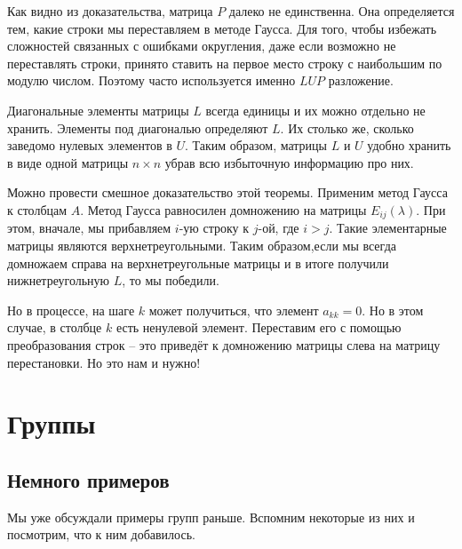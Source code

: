 \rm Как видно из доказательства, матрица $P$ далеко не единственна. Она определяется тем, какие строки мы переставляем в методе Гаусса. Для того, чтобы избежать сложностей связанных с ошибками округления, даже если возможно не переставлять строки, принято ставить на первое место строку с наибольшим по модулю числом.
Поэтому часто используется именно $LUP$ разложение.
\erm

\rm  Диагональные элементы матрицы $L$ всегда единицы и их можно отдельно не хранить. Элементы под диагональю определяют $L$. Их столько же, сколько заведомо нулевых элементов в $U$. Таким образом, матрицы $L$ и $U$ удобно хранить в виде одной матрицы $n\times n$ убрав всю избыточную информацию про них.
\erm


\rm Можно провести смешное доказательство этой теоремы. Применим метод Гаусса к столбцам $A$. Метод Гаусса равносилен домножению на матрицы $E_{ij}(\lambda)$. При этом, вначале, мы прибавляем $i$-ую строку к $j$-ой, где $i>j$. Такие элементарные матрицы являются верхнетреугольными. Таким образом,если мы всегда домножаем справа на верхнетреугольные матрицы и в итоге получили нижнетреугольную $L$, то мы победили. 

Но в процессе, на шаге $k$   может  получиться, что элемент $a_{kk}=0$. Но в этом случае, в столбце $k$ есть ненулевой элемент. Переставим его с помощью преобразования строк -- это приведёт к домножению матрицы слева на матрицу перестановки. Но это нам и нужно!
\erm



\chapter{Группы}

\section{Немного примеров}

Мы уже обсуждали примеры групп раньше. Вспомним некоторые из них  и посмотрим, что к ним добавилось.

